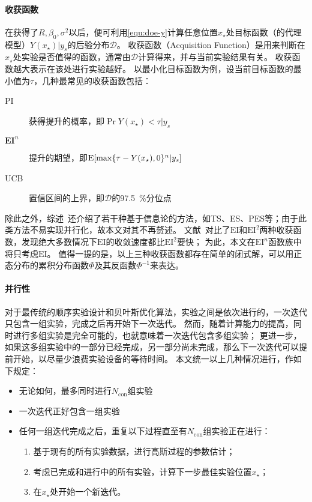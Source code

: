 \documentclass[index]{subfiles}
\begin{document}
\paragraph{收获函数}
在获得了$R,\beta_0,\sigma^2$以后，便可利用\cref{equ:doe-y}计算任意位置$x_\star$处目标函数（的代理模型）$Y(x_\star)|y_s$的后验分布$\mathcal{D}$。
收获函数（Acquisition Function）是用来判断在$x_\star$处实验是否值得的函数，通常由$\mathcal{D}$计算得来，并与当前实验结果有关。
收获函数越大表示在该处进行实验越好。
以最小化目标函数为例，设当前目标函数的最小值为$\tau$，几种最常见的收获函数包括：
\begin{description}
  \item[PI] 获得提升的概率，即$\Pr{Y(x_\star) < \tau|y_s}$
  \item[$\mathbf{EI}^n$] 提升的期望，即$\operatorname{E}\!\left[\max\{\tau - Y(x_\star), 0\}^{n}|y_s\right]$
  \item[UCB] 置信区间的上界，即$\mathcal{D}$的\SI{97.5}{\percent}分位点
\end{description}
除此之外，综述~还介绍了若干种基于信息论的方法，如TS、ES、PES等；由于此类方法不易实现并行化，故本文对其不再赘述。
文献~对比了$\mathrm{EI}$和$\mathrm{EI}^2$两种收获函数，发现绝大多数情况下$\mathrm{EI}$的收敛速度都比$\mathrm{EI}^2$要快；
为此，本文在$\mathrm{EI}^{n}$函数族中将只考虑$\mathrm{EI}$。
值得一提的是，以上三种收获函数都存在简单的闭式解，可以用正态分布的累积分布函数$\Phi$及其反函数$\Phi^{-1}$来表达。

\paragraph{并行性}
对于最传统的顺序实验设计和贝叶斯优化算法，实验之间是依次进行的，一次迭代只包含一组实验，完成之后再开始下一次迭代。
然而，随着计算能力的提高，同时进行多组实验是完全可能的，也就意味着一次迭代包含多组实验；
更进一步，如果这多组实验中的一部分已经完成，另一部分尚未完成，那么下一次迭代可以提前开始，以尽量少浪费实验设备的等待时间。
本文统一以上几种情况进行，作如下规定：
\begin{itemize}
  \item 无论如何，最多同时进行$N_\mathrm{con}$组实验
  \item 一次迭代正好包含一组实验
  \item 任何一组迭代完成之后，重复以下过程直至有$N_\mathrm{con}$组实验正在进行：
  \begin{enumerate}
    \item 基于现有的所有实验数据，进行高斯过程的参数估计；
    \item 考虑已完成和进行中的所有实验，计算下一步最佳实验位置$x_\star$；
    \item 在$x_\star$处开始一个新迭代。
  \end{enumerate}
\end{itemize}
\end{document}
